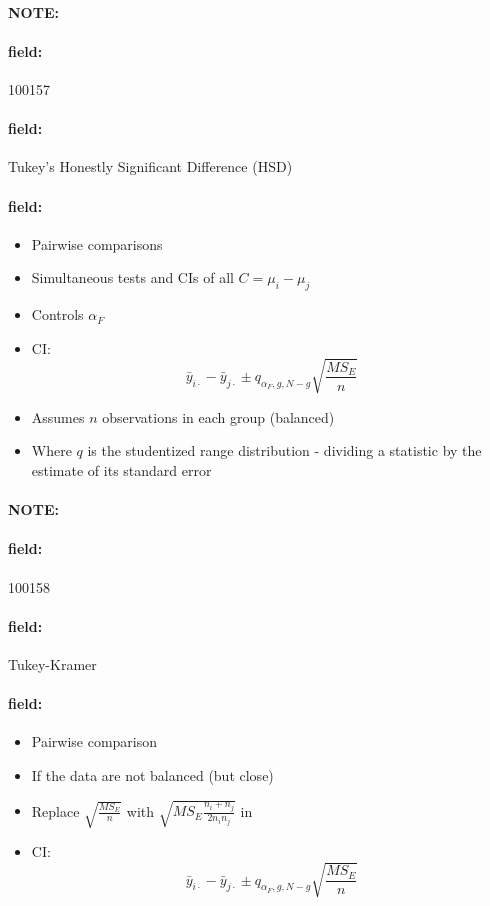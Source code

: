 \documentclass[12pt]{article}
\newenvironment{note}{\paragraph{NOTE:}}{}
\newenvironment{field}{\paragraph{field:}}{}
\begin{document}
\begin{note}
    \begin{field}
        \tiny 100157
    \end{field}
    \begin{field}
        Tukey's Honestly Significant Difference (HSD)
    \end{field}
    \begin{field}
        \begin{itemize}
          \item Pairwise comparisons
          \item Simultaneous tests and CIs of all $C = \mu_i - \mu_j$
          \item Controls $\alpha_F$
          \item CI: $$\bar{y}_{i\cdot} - \bar{y}_{j\cdot} \pm q_{\alpha_F, g, N-g}\sqrt{\frac{MS_E}{n}} $$
          \item Assumes $n$ observations in each group (balanced)
          \item Where $q$ is the studentized range distribution - dividing a statistic by the estimate of its standard error
        \end{itemize}
    \end{field}
\end{note}


\begin{note}
    \begin{field}
        \tiny 100158
    \end{field}
    \begin{field}
        Tukey-Kramer
    \end{field}
    \begin{field}
        \begin{itemize}
          \item Pairwise comparison
          \item If the data are not balanced (but close)
          \item Replace $\sqrt{\frac{MS_E}{n}}$ with $\sqrt{MS_E \frac{n_i + n_j}{2n_in_j}}$ in
          \item  CI: $$\bar{y}_{i\cdot} - \bar{y}_{j\cdot} \pm q_{\alpha_F, g, N-g}\sqrt{\frac{MS_E}{n}} $$
        \end{itemize}
    \end{field}
\end{note}
\end{document}
